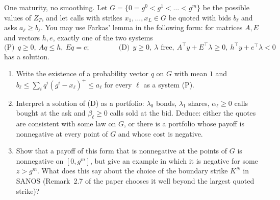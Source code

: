 \begin{exercise}\label{ex:afs-lp-dual}
\hard One maturity, no smoothing. Let $G=\{0=g^0<g^1<\dots<g^m\}$ be the possible values of $Z_T$, and let calls with
strikes $x_1,\dots,x_L\in G$ be quoted with bids $b_\ell$ and asks $a_\ell\ge b_\ell$. You may use Farkas' lemma in the following
form: for matrices $A,E$ and vectors $h,e$, exactly one of the two systems
\[
  \text{(P)}\ \ q\ge0,\ Aq\le h,\ Eq=e;\qquad\qquad\text{(D)}\ \ y\ge0,\ \lambda\text{ free},\ A^\top y+E^\top\lambda\ge0,\ h^\top y+e^\top\lambda<0
\]
has a solution.
\begin{enumerate}[label=(\alph*)]
  \item Write the existence of a probability vector $q$ on $G$ with mean $1$ and $b_\ell\le\sum_iq^i(g^i-x_\ell)^+\le a_\ell$ for every
    $\ell$ as a system (P).
  \item Interpret a solution of (D) as a portfolio: $\lambda_0$ bonds, $\lambda_1$ shares, $\alpha_\ell\ge0$ calls bought at the ask and $\beta_\ell\ge0$
    calls sold at the bid. Deduce: either the quotes are consistent with some law on $G$, or there is a portfolio whose payoff
    is nonnegative at every point of $G$ and whose cost is negative.
  \item Show that a payoff of this form that is nonnegative at the points of $G$ is nonnegative on $[0,g^m]$, but give an example
    in which it is negative for some $z>g^m$. What does this say about the choice of the boundary strike $K^N$ in SANOS
    (Remark~2.7 of the paper chooses it well beyond the largest quoted strike)?
\end{enumerate}
\end{exercise}

